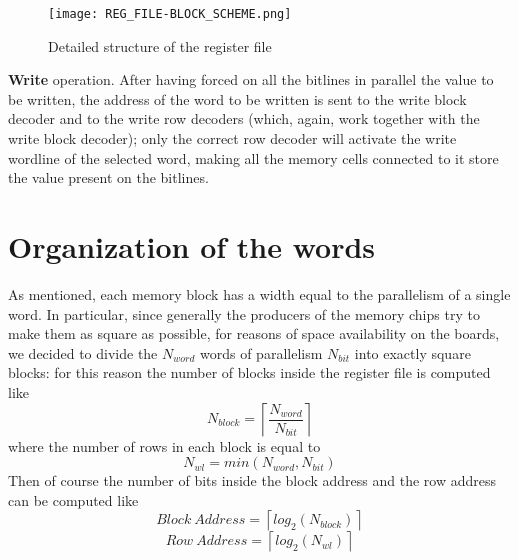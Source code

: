 \begin{figure}[H] 
	\begin{center}
		\texttt{[image: REG\_FILE-BLOCK\_SCHEME.png]}
	\end{center}
	\caption{Detailed structure of the register file} 
	\label{fig:REG_FILE-BLOCK_SCHEME}
\end{figure} 

\textbf{Write} operation. After having forced on all the bitlines in parallel the value to be written, the address of the word to be written is sent to the write block decoder and to the write row decoders (which, again, work together with the write block decoder); only the correct row decoder will activate the write wordline of the selected word, making all the memory cells connected to it store the value present on the bitlines. 

\section{Organization of the words}
As mentioned, each memory block has a width equal to the parallelism of a single word. In particular, since generally the producers of the memory chips try to make them as square as possible, for reasons of space availability on the boards, we decided to divide the $N_{word}$ words of parallelism $N_{bit}$ into exactly square blocks: for this reason the number of blocks inside the register file is computed like $$N_{block}=\left\lceil\frac{N_{word}}{N_{bit}}\right\rceil$$
where the number of rows in each block is equal to $$N_{wl}=min(N_{word},N_{bit})$$
Then of course the number of bits inside the block address and the row address can be computed like $$Block\ Address=\left\lceil log_2(N_{block})\right\rceil$$ $$Row\ Address=\left\lceil log_2(N_{wl})\right\rceil$$